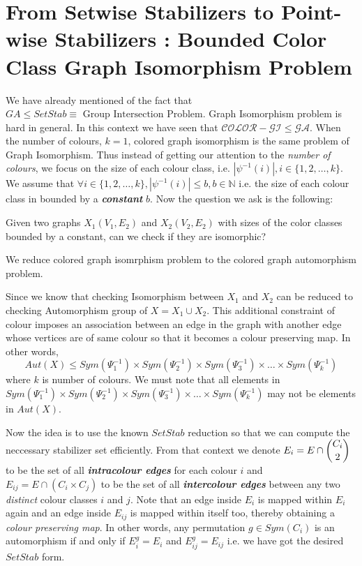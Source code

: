 \section{From Setwise Stabilizers to Point-wise Stabilizers : Bounded Color Class Graph Isomorphism Problem}

We have already mentioned of the fact that $GA\leq SetStab\equiv\text{ Group Intersection Problem}$. Graph Isomorphism problem is hard in general. In this context we have seen that $\mathcal{COLOR-GI}\leq \mathcal{GA}$. When the number of colours, $k=1$, colored graph isomorphism is the same problem of Graph Isomorphism. Thus instead of getting our attention to the \emph{number of colours}, we focus on the size of each colour class, i.e. $|\psi^{-1}(i)|, i\in \{1,2,\ldots,k\}$. We assume that $\forall i\in\{1,2,\ldots,k\}, |\psi^{-1}(i)|\leq b, b\in \mathbb{N}$ i.e. the size of each colour class in bounded by a {\bf \emph{constant}} $b$. Now the question we ask is the following:
\begin{problem}
	Given two graphs $X_1(V_1,E_2)$ and $X_2(V_2,E_2)$ with sizes of the color classes bounded by a constant, can we check if they are isomorphic?
\end{problem}

We reduce colored graph isomrphism problem to the colored graph automorphism problem.

Since we know that checking Isomorphism between $X_1$ and $X_2$ can be reduced to checking Automorphism group of $X = X_1 \cup X_2$. This additional constraint of colour imposes an association between an edge in the graph with another edge whose vertices are of same colour so that it becomes a colour preserving map. In other words,
\begin{equation*}
	Aut(X)\leq Sym(\Psi^{-1}_1) \times Sym(\Psi^{-1}_2) \times Sym(\Psi^{-1}_3) \times \ldots \times Sym(\Psi^{-1}_k)
\end{equation*}
where $k$ is number of colours. We must note that all elements in $Sym(\Psi^{-1}_1) \times Sym(\Psi^{-1}_2) \times Sym(\Psi^{-1}_3) \times \ldots \times Sym(\Psi^{-1}_k)$ may not be elements in $Aut(X)$. 


Now the idea is to use the known $SetStab$ reduction so that we can compute the neccessary stabilizer set efficiently. From that context we denote $E_i = E\cap \dbinom{C_i}{2}$ to be the set of all {\bf \emph{intracolour edges}} for each colour $i$ and $E_{ij} = E\cap (C_i\times C_j)$ to be the set of all {\bf \emph{intercolour edges}} between any two \emph{distinct} colour classes $i$ and $j$. Note that an edge inside $E_i$ is mapped within $E_i$ again and an edge inside $E_{ij}$ is mapped within itself too, thereby obtaining a \emph{colour preserving map}. In other words, any permutation $g \in Sym(C_i)$ is an automorphism if and only if $E_i^g = E_i$ and $E_{ij}^g = E_{ij}$ i.e. we have got the desired $SetStab$ form.


